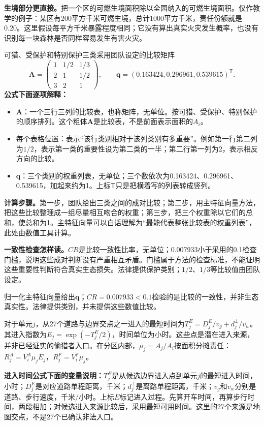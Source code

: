 \documentclass[12pt,a4paper]{article}
\numberwithin{equation}{section}
\begin{document}
\noindent\textbf{生境部分更直接。}把一个区的可燃生境面积除以全园纳入的可燃生境面积。仅作教学的例子：某区有200平方千米可燃生境，总计1000平方千米，责任份额就是0.20。这里假设每平方千米暴露程度相同；它没有算出真实火灾发生概率，也没有识别每一块森林是否同样容易发生有害火灾。

可猎、受保护和特别保护三类采用团队设定的比较矩阵
\begin{equation}
\mathbf A=\begin{pmatrix}1&1/2&1/3\\2&1&1/2\\3&2&1\end{pmatrix},\qquad
\mathbf q=(0.163424,0.296961,0.539615)^{\mathsf T}.
\label{eq:ahp}
\end{equation}
\noindent\textbf{公式下面逐项解释：}
\begin{itemize}
\item $\mathbf A$：一个三行三列的比较表，也称矩阵，无单位。按可猎、受保护、特别保护的顺序排列。这个粗体$\mathbf A$是比较表，不是前面表示面积的$A_i$。
\item 每个表格位置：表示“该行类别相对于该列类别有多重要”。例如第一行第二列为$1/2$，表示第一类的重要性设为第二类的一半；第二行第一列为2，表示相反方向的比较。
\item $\mathbf q$：三个类别的权重列表，无单位；三个数依次为0.163424、0.296961、0.539615，加起来约为1。上标$\mathsf T$只是把横着写的列表转成竖列。
\end{itemize}
\noindent\textbf{计算步骤。}第一步，团队给出三类之间的成对比较；第二步，用主特征向量方法，把这些比较整理成一组尽量相互吻合的权重；第三步，把三个权重除以它们的总和，使总和为1。主特征向量可以白话理解为“最能代表整张比较表的权重列表”，此处由数值工具计算。

\noindent\textbf{一致性检查怎样读。}$CR$是比较一致性比率，无单位；0.007933小于采用的0.1检查门槛，说明这些成对判断没有严重相互矛盾。门槛属于方法的检查标准，不能证明这些重要性判断符合真实生态损失。法律提供保护类别；$1/2$、$1/3$等比较值由团队设定。

归一化主特征向量给出$\mathbf q$；$CR=0.007933<0.1$检验的是比较的一致性，并非生态真实性。法律提供类别，并未提供这些数值比较\cite{law}。

对于单元$j$，从27个道路与边界交点之一进入的最短时间为$T_j^E=D_j^E/v_g+d_j^\perp/v_w$。其进入指数为$E_j=\exp(-T_j^E/2)$，时间单位为小时。这些点是潜在进入来源，并非已经证实的偷猎者入口。在分区内部，$\mu_j=A_j/A_i$按面积分摊责任：$R_j^A=V_i^A\mu_jE_j$，$R_j^F=V_i^F\mu_j$。

\noindent\textbf{进入时间公式下面的变量说明：}$T_j^E$是从候选边界进入点到单元$j$的最短进入时间，小时；$D_j^E$是对应道路单程距离，千米；$d_j^{\perp}$是离路单程距离，千米；$v_g$和$v_w$分别是道路、步行速度，千米/小时。上标$E$标记进入过程。先算开车时间，再算步行时间，两段相加；对候选进入来源比较后，采用最短可用时间。这里的27个来源是地图交点，不是27个已确认非法入口。
\end{document}
